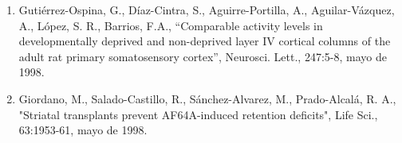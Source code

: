 \begin{enumerate}
\item Gutiérrez-Ospina, G., Díaz-Cintra, S., Aguirre-Portilla, A., Aguilar-Vázquez, A., López, S. R., Barrios, F.A., 
“Comparable activity levels in developmentally deprived and non-deprived layer IV cortical columns of the adult rat primary 
somatosensory cortex”, Neurosci. Lett., 247:5-8, mayo de 1998.

\item Giordano, M., Salado-Castillo, R., Sánchez-Alvarez, M., Prado-Alcalá, R. A., "Striatal transplants prevent AF64A-induced retention deficits", Life Sci., 63:1953-61, mayo de 1998.

\end{enumerate}

